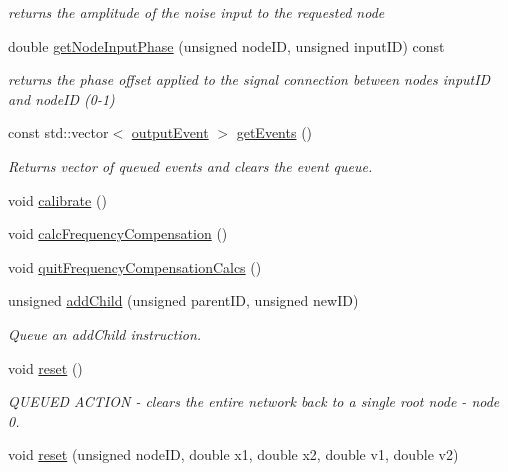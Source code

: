 \begin{DoxyCompactItemize}
\begin{DoxyCompactList}\small\item\em returns the amplitude of the noise input to the requested node \end{DoxyCompactList}\item 
double \mbox{\hyperlink{classMatsuokaEngine_a0f7aa58c722f9bce30724d4a62c72374}{get\+Node\+Input\+Phase}} (unsigned node\+ID, unsigned input\+ID) const
\begin{DoxyCompactList}\small\item\em returns the phase offset applied to the signal connection between nodes input\+ID and node\+ID (0-\/1) \end{DoxyCompactList}\item 
const std\+::vector$<$ \mbox{\hyperlink{classMatsuokaEngine_a09035e4918ce82c9378821c88375f843}{output\+Event}} $>$ \mbox{\hyperlink{classMatsuokaEngine_a70444163eee59d0df5b282bb8696f5a1}{get\+Events}} ()
\begin{DoxyCompactList}\small\item\em Returns vector of queued events and clears the event queue. \end{DoxyCompactList}\item 
void \mbox{\hyperlink{classMatsuokaEngine_a68d6295dfa0d28e3bc9d743e763d6ee9}{calibrate}} ()
\item 
void \mbox{\hyperlink{classMatsuokaEngine_a7b665074cd1e6fddc875c7d36b305f66}{calc\+Frequency\+Compensation}} ()
\item 
void \mbox{\hyperlink{classMatsuokaEngine_a7937f29c227ad663eb153b01b11d307f}{quit\+Frequency\+Compensation\+Calcs}} ()
\item 
unsigned \mbox{\hyperlink{classMatsuokaEngine_a2e441b2259ae96759bf300c1f2af4ab1}{add\+Child}} (unsigned parent\+ID, unsigned new\+ID)
\begin{DoxyCompactList}\small\item\em Queue an add\+Child instruction. \end{DoxyCompactList}\item 
void \mbox{\hyperlink{classMatsuokaEngine_a627983362b1b84ee5d3c72d7540d9a47}{reset}} ()
\begin{DoxyCompactList}\small\item\em Q\+U\+E\+U\+ED A\+C\+T\+I\+ON -\/ clears the entire network back to a single root node -\/ node 0. \end{DoxyCompactList}\item 
void \mbox{\hyperlink{classMatsuokaEngine_aa2a425173fed2f3f30c1fa5c6e680764}{reset}} (unsigned node\+ID, double x1, double x2, double v1, double v2)

\end{DoxyCompactItemize}
